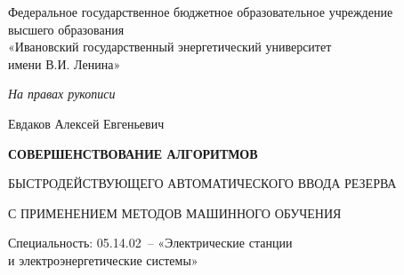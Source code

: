 
\begin{titlepage}
\begin{center}
Федеральное государственное бюджетное образовательное учреждение \\
высшего образования \\
«Ивановский государственный энергетический университет \\
имени В.И. Ленина»
\end{center}

\vspace{1.5cm}

\begin{flushright}
\textit{На правах рукописи}
\end{flushright}

\vspace{1.5cm}

\begin{center}
{\large Евдаков Алексей Евгеньевич\par}

\vspace{1.5cm}

{\Large\bfseries
СОВЕРШЕНСТВОВАНИЕ АЛГОРИТМОВ\par
\vspace{0.3cm}
БЫСТРОДЕЙСТВУЮЩЕГО АВТОМАТИЧЕСКОГО ВВОДА РЕЗЕРВА\par
\vspace{0.3cm}
С ПРИМЕНЕНИЕМ МЕТОДОВ МАШИННОГО ОБУЧЕНИЯ\par}

\vspace{1.5cm}

Специальность: 05.14.02~-- «Электрические станции \\
и электроэнергетические системы»\par

\vspace{1cm}


\end{center}
\end{titlepage}
